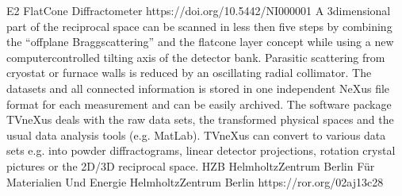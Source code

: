 \documentclass[a4paper,10pt,english]{sphinxmanual}
\begin{document}
\begin{sphinxVerbatim}[commandchars=\\\{\}]
    
     E2 \PYGZhy{} Flat\PYGZhy{}Cone Diffractometer
     https://doi.org/10.5442/NI000001
     A 3\PYGZhy{}dimensional part of the reciprocal space can be scanned in less then five steps by combining the “off\PYGZhy{}plane Bragg\PYGZhy{}scattering” and the flat\PYGZhy{}cone layer concept while using a new computer\PYGZhy{}controlled tilting axis of the detector bank. Parasitic scattering from cryostat or furnace walls is reduced by an oscillating \PYGZbs{}\PYGZdq{}radial\PYGZbs{}\PYGZdq{} collimator. The datasets and all connected information is stored in one independent NeXus file format for each measurement and can be easily archived. The software package TVneXus deals with the raw data sets, the transformed physical spaces and the usual data analysis tools (e.g. MatLab). TVneXus can convert to various data sets e.g. into powder diffractograms, linear detector projections, rotation crystal pictures or the 2D/3D reciprocal space.
       
        HZB
         Helmholtz\PYGZhy{}Zentrum Berlin Für Materialien Und Energie
         Helmholtz\PYGZhy{}Zentrum Berlin
        https://ror.org/02aj13c28
\end{sphinxVerbatim}
\end{document}
